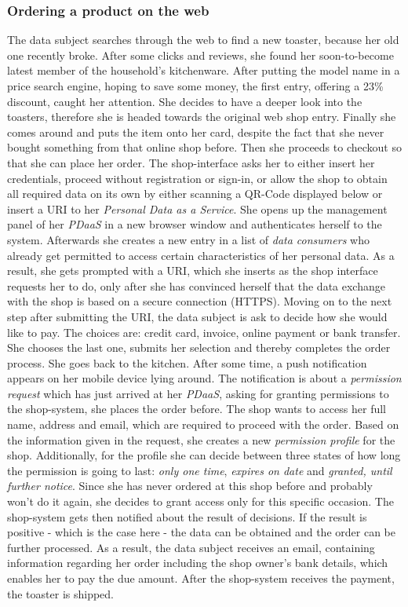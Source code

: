 \documentclass[12pt,english,a4paper,titlepage,cleardoublepage=empty,dottedtoc]{report}
\begin{document}
\subsubsection{Ordering a product on the
web}\label{ordering-a-product-on-the-web}

The data subject searches through the web to find a new toaster, because
her old one recently broke. After some clicks and reviews, she found her
soon-to-become latest member of the household's kitchenware. After
putting the model name in a price search engine, hoping to save some
money, the first entry, offering a 23\% discount, caught her attention.
She decides to have a deeper look into the toasters, therefore she is
headed towards the original web shop entry. Finally she comes around and
puts the item onto her card, despite the fact that she never bought
something from that online shop before. Then she proceeds to checkout so
that she can place her order. The shop-interface asks her to either
insert her credentials, proceed without registration or sign-in, or
allow the shop to obtain all required data on its own by either scanning
a QR-Code displayed below or insert a URI to her \emph{Personal Data as
a Service}. She opens up the management panel of her \emph{PDaaS} in a
new browser window and authenticates herself to the system. Afterwards
she creates a new entry in a list of \emph{data consumers} who already
get permitted to access certain characteristics of her personal data. As
a result, she gets prompted with a URI, which she inserts as the shop
interface requests her to do, only after she has convinced herself that
the data exchange with the shop is based on a secure connection (HTTPS).
Moving on to the next step after submitting the URI, the data subject is
ask to decide how she would like to pay. The choices are: credit card,
invoice, online payment or bank transfer. She chooses the last one,
submits her selection and thereby completes the order process. She goes
back to the kitchen. After some time, a push notification appears on her
mobile device lying around. The notification is about a \emph{permission
request} which has just arrived at her \emph{PDaaS}, asking for granting
permissions to the shop-system, she places the order before. The shop
wants to access her full name, address and email, which are required to
proceed with the order. Based on the information given in the request,
she creates a new \emph{permission profile} for the shop. Additionally,
for the profile she can decide between three states of how long the
permission is going to last: \emph{only one time}, \emph{expires on
date} and \emph{granted, until further notice}. Since she has never
ordered at this shop before and probably won't do it again, she decides
to grant access only for this specific occasion. The shop-system gets
then notified about the result of decisions. If the result is positive -
which is the case here - the data can be obtained and the order can be
further processed. As a result, the data subject receives an email,
containing information regarding her order including the shop owner's
bank details, which enables her to pay the due amount. After the
shop-system receives the payment, the toaster is shipped.
\end{document}
